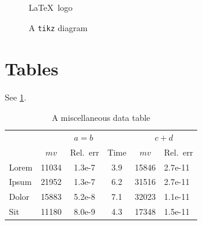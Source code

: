 \documentclass{baseline}
\begin{document}
\begin{figure}
    \centering
    
    \caption{\LaTeX\ logo}\label{fig:latex-logo}
\end{figure}

\begin{figure}
    \centering
    \caption{A \texttt{tikz} diagram}
\end{figure}

\section{Tables}

See \cref{table:misc}.

\begin{table}
\centering
\begin{tabular}{lccccl}\toprule
      & \multicolumn{3}{c}{\(a = b\)} & \multicolumn{2}{c}{\(c + d\)} \\
      \cmidrule(lr){2-4}\cmidrule(lr){5-6}
      & \(mv\)  & Rel.~err & Time    & \(mv\)  & Rel.~err \\\midrule
Lorem & 11034   & 1.3e-7   & 3.9     & 15846   & 2.7e-11  \\
Ipsum & 21952   & 1.3e-7   & 6.2     & 31516   & 2.7e-11  \\
Dolor & 15883   & 5.2e-8   & 7.1     & 32023   & 1.1e-11  \\
Sit   & 11180   & 8.0e-9   & 4.3     & 17348   & 1.5e-11  \\\bottomrule
\end{tabular}
\caption{A miscellaneous data table}
\label{table:misc}
\end{table}

\Blinddocument

\pagebreak

\printbibliography{}
\end{document}
